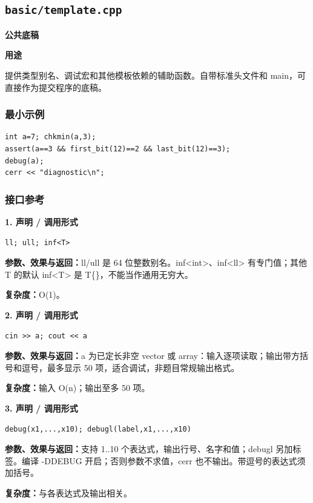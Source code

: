 \documentclass[UTF8,a4paper,10pt]{ctexart}
\newcommand{\TemplUsage}[1]{\textbf{用途}\par #1\par}
\begin{document}
\subsection{\texttt{basic/template.cpp}}
\textbf{公共底稿}\par
\TemplUsage{提供类型别名、调试宏和其他模板依赖的辅助函数。自带标准头文件和 main，可直接作为提交程序的底稿。}
\subsubsection*{最小示例}
\begin{lstlisting}
int a=7; chkmin(a,3);
assert(a==3 && first_bit(12)==2 && last_bit(12)==3);
debug(a);
cerr << "diagnostic\n";
\end{lstlisting}
\subsubsection*{接口参考}
\noindent\begin{minipage}{\textwidth}
\textbf{1. 声明 / 调用形式}
\begin{lstlisting}
ll; ull; inf<T>
\end{lstlisting}
\textbf{参数、效果与返回：}ll/ull 是 64 位整数别名。inf<int>、inf<ll> 有专门值；其他 T 的默认 inf<T> 是 T\{\}，不能当作通用无穷大。

\textbf{复杂度：}O(1)。

\end{minipage}\par\vspace{0.4em}
\noindent\begin{minipage}{\textwidth}
\textbf{2. 声明 / 调用形式}
\begin{lstlisting}
cin >> a; cout << a
\end{lstlisting}
\textbf{参数、效果与返回：}a 为已定长非空 vector 或 array：输入逐项读取；输出带方括号和逗号，最多显示 50 项，适合调试，非题目常规输出格式。

\textbf{复杂度：}输入 O(n)；输出至多 50 项。

\end{minipage}\par\vspace{0.4em}
\noindent\begin{minipage}{\textwidth}
\textbf{3. 声明 / 调用形式}
\begin{lstlisting}
debug(x1,...,x10); debugl(label,x1,...,x10)
\end{lstlisting}
\textbf{参数、效果与返回：}支持 1..10 个表达式，输出行号、名字和值；debugl 另加标签。编译 -DDEBUG 开启；否则参数不求值，cerr 也不输出。带逗号的表达式须加括号。

\textbf{复杂度：}与各表达式及输出相关。

\end{minipage}\par\vspace{0.4em}
\end{document}
